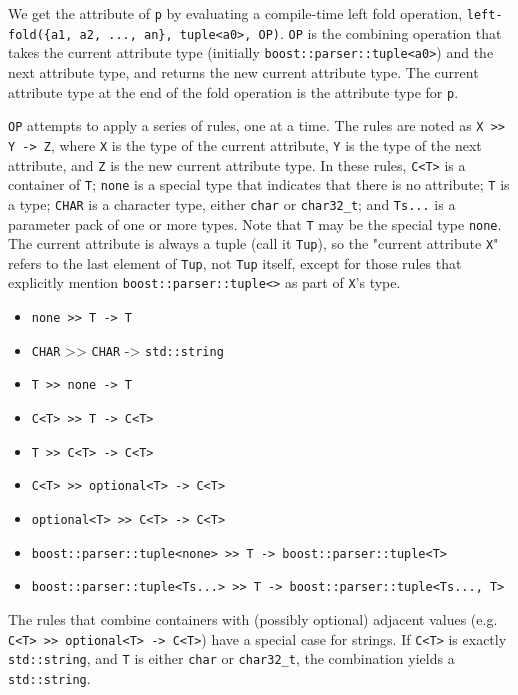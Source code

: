 We get the attribute of \texttt{p} by evaluating a compile-time left fold operation, \texttt{left-fold(\{a1, a2, ..., an\}, tuple<a0>, OP)}. \texttt{OP} is the combining operation that takes the current attribute type (initially \texttt{boost::parser::tuple<a0>}) and the next attribute type, and returns the new current attribute type. The current attribute type at the end of the fold operation is the attribute type for \texttt{p}.

\texttt{OP} attempts to apply a series of rules, one at a time. The rules are noted as \texttt{X >> Y -> Z}, where \texttt{X} is the type of the current attribute, \texttt{Y} is the type of the next attribute, and \texttt{Z} is the new current attribute type. In these rules, \texttt{C<T>} is a container of \texttt{T}; \texttt{none} is a special type that indicates that there is no attribute; \texttt{T} is a type; \texttt{CHAR} is a character type, either \texttt{char} or \texttt{char32\_t}; and \texttt{Ts...} is a parameter pack of one or more types. Note that \texttt{T} may be the special type \texttt{none}. The current attribute is always a tuple (call it \texttt{Tup}), so the "current attribute \texttt{X}" refers to the last element of \texttt{Tup}, not \texttt{Tup} itself, except for those rules that explicitly mention \texttt{boost::parser::tuple<>} as part of \texttt{X}'s type.

\begin{itemize}
\item
  \texttt{none >> T -> T}
\item
  \texttt{CHAR} \textgreater> \texttt{CHAR} -> \texttt{std::string}
\item
  \texttt{T >> none -> T}
\item
  \texttt{C<T> >> T -> C<T>}
\item
  \texttt{T >> C<T> -> C<T>}
\item
  \texttt{C<T> >> optional<T> -> C<T>}
\item
  \texttt{optional<T> >> C<T> -> C<T>}
\item
  \texttt{boost::parser::tuple<none> >> T -> boost::parser::tuple<T>}
\item
  \texttt{boost::parser::tuple<Ts...> >> T -> boost::parser::tuple<Ts..., T>}
\end{itemize}

The rules that combine containers with (possibly optional) adjacent values (e.g. \texttt{C<T> >> optional<T> -> C<T>}) have a special case for strings. If \texttt{C<T>} is exactly \texttt{std::string}, and \texttt{T} is either \texttt{char} or \texttt{char32\_t}, the combination yields a \texttt{std::string}.

